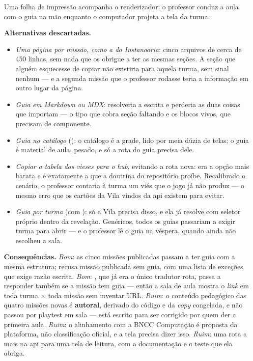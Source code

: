 Uma folha de impressão acompanha o renderizador: o professor conduz a aula com o
guia na mão enquanto o computador projeta a tela da turma.

\textbf{Alternativas descartadas.}
\begin{itemize}
  \item \emph{Uma página por missão, como a do Instanooria}: cinco arquivos de
    cerca de 450 linhas, sem nada que os obrigue a ter as mesmas seções. A seção
    que alguém esquecesse de copiar não existiria para aquela turma, sem sinal
    nenhum --- e a segunda missão que o professor rodasse teria a informação em
    outro lugar da página.
  \item \emph{Guia em Markdown ou MDX}: resolveria a escrita e perderia as duas
    coisas que importam --- o tipo que cobra seção faltando e os blocos vivos,
    que precisam de componente.
  \item \emph{Guia no catálogo} (): o catálogo
    é a grade, lido por meia dúzia de telas; o guia é material de aula, pesado, e
    só a rota do guia precisa dele.
  \item \emph{Copiar a tabela dos vieses para o hub}, evitando a rota nova: era
    a opção mais barata e é exatamente a que a doutrina do repositório proíbe.
    Recalibrado o cenário, o professor contaria à turma um viés que o jogo já não
    produz --- o mesmo erro que os cartões da Vila vindos da api existem para
    evitar.
  \item \emph{Guia por turma} (com ): só a Vila precisa disso, e
    ela já resolve com seletor próprio dentro da revelação. Genéricos, todos os
    guias passariam a exigir turma para abrir --- e o professor lê o guia na
    véspera, quando ainda não escolheu a sala.
\end{itemize}

\textbf{Consequências.} \emph{Bom}: as cinco missões publicadas passam a ter
guia com a mesma estrutura;  recusa missão publicada sem
guia, com uma lista de exceções que exige razão escrita. \emph{Bom}:
, que já era o único tradutor  \seta{}
rota, passa a responder também se a missão tem guia --- então a sala de aula
mostra o \emph{link} em toda turma × toda missão sem inventar URL.
\emph{Ruim}: o conteúdo pedagógico das quatro missões novas é \textbf{autoral},
derivado do código e da \emph{copy} congelada, e não passou por playtest em sala
--- está escrito para ser corrigido por quem der a primeira aula. \emph{Ruim}: o
alinhamento com a BNCC Computação é proposta da plataforma, não classificação
oficial, e a tela precisa dizer isso. \emph{Ruim}: uma rota a mais na api para
uma tela de leitura, com a documentação e o teste que ela obriga.

